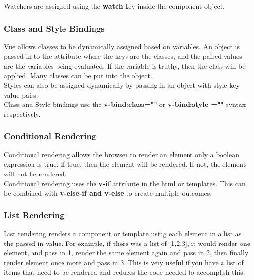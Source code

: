 \documentclass[portfolio.tex]{subfiles}
\begin{document}
					\hspace{-0.5cm}Watchers are assigned using the \textbf{watch} key inside the component object. \autocite{vue-computed}
				\subsubsection{Class and Style Bindings}
					Vue allows classes to be dynamically assigned based on variables. An object is passed in to the attribute where the keys are the classes, and the paired values are the variables being evaluated. If the variable is truthy, then the class will be applied. Many classes can be put into the object.\\

					\hspace{-0.5cm}Styles can also be assigned dynamically by passing in an object with style key-value pairs.\\

					\hspace{-0.5cm}Class and Style bindings use the \textbf{v-bind:class=""} or \textbf{v-bind:style =""} syntax respectively. \autocite{vue-class}

				\subsubsection{Conditional Rendering}
					Conditional rendering allows the browser to render an element only a boolean expression is true. If true, then the element will be rendered. If not, the element will not be rendered.\\

					\noindent Conditional rendering uses the \textbf{v-if} attribute in the html or templates. This can be combined with \textbf{v-else-if and v-else} to create multiple outcomes. \autocite{vue-conditional}

				\subsubsection{List Rendering}
					List rendering renders a component or template using each element in a list as the passed in value. For example, if there was a list of [1,2,3], it would render one element, and pass in 1, render the same element again and pass in 2, then finally render element once more and pass in 3. This is very useful if you have a list of items that need to be rendered and reduces the code needed to accomplish this.\\
\end{document}
